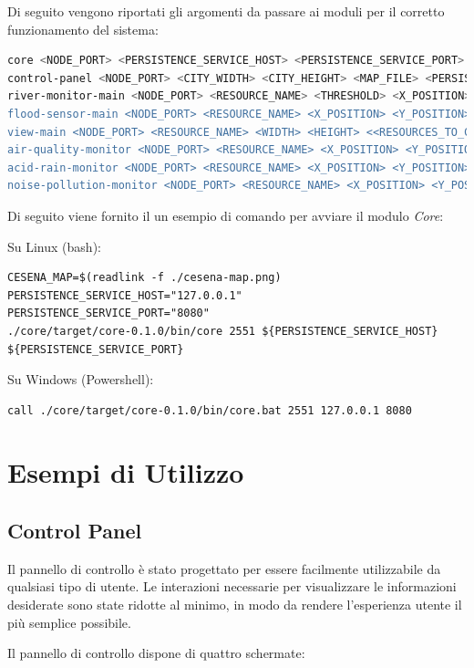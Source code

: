 \documentclass{scrartcl}
\begin{document}
Di seguito vengono riportati gli argomenti da passare ai moduli per il corretto funzionamento del sistema:
\begin{lstlisting}[language=bash]
core <NODE_PORT> <PERSISTENCE_SERVICE_HOST> <PERSISTENCE_SERVICE_PORT>
control-panel <NODE_PORT> <CITY_WIDTH> <CITY_HEIGHT> <MAP_FILE> <PERSISTENCE_SERVICE_HOST> <PERSISTENCE_SERVICE_PORT>
river-monitor-main <NODE_PORT> <RESOURCE_NAME> <THRESHOLD> <X_POSITION> <Y_POSITION> <<RESOURCES_TO_CHECK>...>
flood-sensor-main <NODE_PORT> <RESOURCE_NAME> <X_POSITION> <Y_POSITION>
view-main <NODE_PORT> <RESOURCE_NAME> <WIDTH> <HEIGHT> <<RESOURCES_TO_CHECK>...>
air-quality-monitor <NODE_PORT> <RESOURCE_NAME> <X_POSITION> <Y_POSITION> <SENSOR_URI>
acid-rain-monitor <NODE_PORT> <RESOURCE_NAME> <X_POSITION> <Y_POSITION>
noise-pollution-monitor <NODE_PORT> <RESOURCE_NAME> <X_POSITION> <Y_POSITION>
\end{lstlisting}

Di seguito viene fornito il un esempio di comando per avviare il modulo \textit{Core}:

Su Linux (bash):
\begin{lstlisting}
CESENA_MAP=$(readlink -f ./cesena-map.png)
PERSISTENCE_SERVICE_HOST="127.0.0.1"
PERSISTENCE_SERVICE_PORT="8080"
./core/target/core-0.1.0/bin/core 2551 ${PERSISTENCE_SERVICE_HOST} ${PERSISTENCE_SERVICE_PORT}
\end{lstlisting}

Su Windows (Powershell):
\begin{lstlisting}
call ./core/target/core-0.1.0/bin/core.bat 2551 127.0.0.1 8080
\end{lstlisting}

\section{Esempi di Utilizzo}

\subsection{Control Panel}

Il pannello di controllo è stato progettato per essere facilmente utilizzabile da qualsiasi tipo di utente. Le interazioni necessarie per visualizzare le informazioni desiderate sono state ridotte al minimo, in modo da rendere l'esperienza utente il più semplice possibile.

Il pannello di controllo dispone di quattro schermate:
\end{document}

